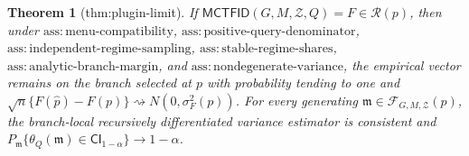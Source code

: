 \documentclass{article}
\newtheorem{theorem}{Theorem}
\begin{document}
\begin{theorem}[thm:plugin-limit]\label{thm:plugin-limit}
If \(\mathsf{MCTFID}(G,M,\mathcal Z,Q)=F\in\mathcal R(p)\), then under \(\mathrm{ass:menu\text{-}compatibility}\), \(\mathrm{ass:positive\text{-}query\text{-}denominator}\), \(\mathrm{ass:independent\text{-}regime\text{-}sampling}\), \(\mathrm{ass:stable\text{-}regime\text{-}shares}\), \(\mathrm{ass:analytic\text{-}branch\text{-}margin}\), and \(\mathrm{ass:nondegenerate\text{-}variance}\), the empirical vector remains on the branch selected at \(p\) with probability tending to one and \(\sqrt n\{F(\widehat p)-F(p)\}\rightsquigarrow N(0,\sigma_F^2(p))\). For every generating \(\mathfrak m\in\mathcal F_{G,M,\mathcal Z}(p)\), the branch-local recursively differentiated variance estimator is consistent and \(P_{\mathfrak m}\{\theta_Q(\mathfrak m)\in\mathsf{CI}_{1-\alpha}\}\to1-\alpha\).
\end{theorem}
\end{document}
